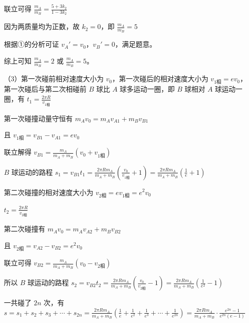 \documentclass[\gkver]{gaokaozhenti}
\begin{document}
\begin{enumerate}
{联立可得 $\frac{m_{A}}{m_{B}}=\frac{5+3k_{2}}{1-3k_{2}}$

因为两质量均为正数，故 $k_{2}=0$，即 $\frac{m_{A}}{m_{B}}=5$

根据①的分析可证 $v_{A}' = v_{0}$，$v_{B}' = 0$，满足题意。

综上可知 $\frac{m_{A}}{m_{B}}=2$ 或 $\frac{m_{A}}{m_{B}}=5$。

（3）第一次碰前相对速度大小为 $v_{0}$，第一次碰后的相对速度大小为 $v_{1\text{相}} = ev_{0}$，第一次碰后与第二次相碰前 $B$ 球比 $A$ 球多运动一圈，即 $B$ 球相对 $A$ 球运动一圈，有 $t_{1}=\frac{2\pi R}{v_{1\text{相}}}$

第一次碰撞动量守恒有 $m_{A}v_{0}=m_{A}v_{A1}+m_{B}v_{B1}$

且 $v_{1\text{相}}=v_{B1}-v_{A1}=ev_{0}$

联立解得 $v_{B1}=\frac{m_{A}}{m_{A}+m_{B}}\left(v_{0}+v_{1\text{相}}\right)$

$B$ 球运动的路程 $s_{1}=v_{B1}t_{1}=\frac{2\pi Rm_{A}}{m_{A}+m_{B}}\left(\frac{v_{0}}{v_{1\text{相}}}+1\right)=\frac{2\pi Rm_{A}}{m_{A}+m_{B}}\left(\frac{1}{e}+1\right)$

第二次碰撞的相对速度大小为 $v_{2\text{相}}=ev_{1\text{相}}=e^{2}v_{0}$

$t_{2}=\frac{2\pi R}{v_{2\text{相}}}$

第二次碰撞有 $m_{A}v_{0}=m_{A}v_{A2}+m_{B}v_{B2}$

且 $v_{2\text{相}}=v_{A2}-v_{B2}=e^{2}v_{0}$

联立可得 $v_{B2}=\frac{m_{A}}{m_{A}+m_{B}}\left(v_{0}-v_{2\text{相}}\right)$

所以 $B$ 球运动的路程 $s_{2}=v_{B2}t_{2}=\frac{2\pi Rm_{A}}{m_{A}+m_{B}}\left(\frac{v_{0}}{v_{2\text{相}}}-1\right)=\frac{2\pi Rm_{A}}{m_{A}+m_{B}}\left(\frac{1}{e^{2}}-1\right)$

一共碰了 $2n$ 次，有 $s=s_{1}+s_{2}+s_{3}+\cdots+s_{2n}=\frac{2\pi Rm_{A}}{m_{A}+m_{B}}\left(\frac{1}{e}+\frac{1}{e^{2}}+\frac{1}{e^{3}}+\cdots+\frac{1}{e^{2n}}\right)=\frac{2\pi Rm_{A}}{m_{A}+m_{B}}\cdot\frac{e^{2n}-1}{e^{2n}(e-1)}$
}

\end{enumerate}
\end{document}
